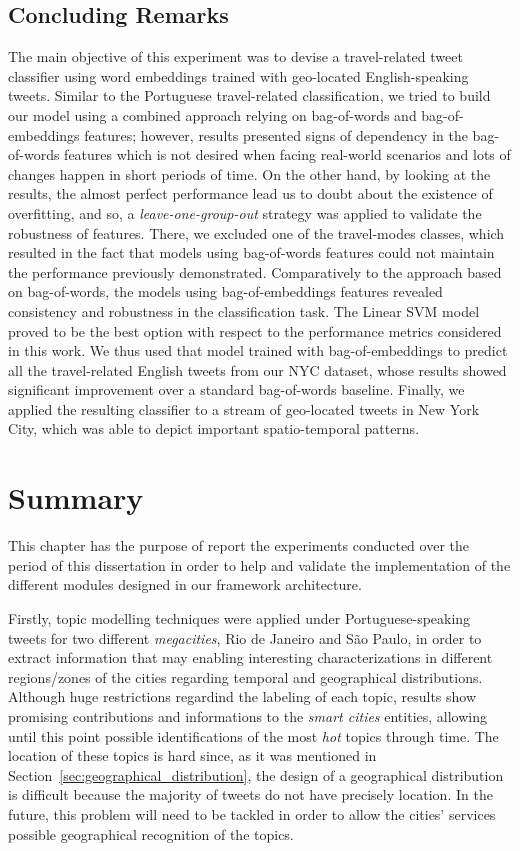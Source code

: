 \subsection{Concluding Remarks}
The main objective of this experiment was to devise a travel-related tweet classifier using word embeddings trained with geo-located English-speaking tweets. Similar to the Portuguese travel-related classification, we tried to build our model using a combined approach relying on bag-of-words and bag-of-embeddings features; however, results presented signs of dependency in the bag-of-words features which is not desired when facing real-world scenarios and lots of changes happen in short periods of time. On the other hand, by looking at the results, the almost perfect performance lead us to doubt about the existence of overfitting, and so, a \emph{leave-one-group-out} strategy was applied to validate the robustness of features. There, we excluded one of the travel-modes classes, which resulted in the fact that models using bag-of-words features could not maintain the performance previously demonstrated. Comparatively to the approach based on bag-of-words, the models using bag-of-embeddings features revealed consistency and robustness in the classification task. The Linear SVM model proved to be the best option with respect to the performance metrics considered in this work. We thus used that model trained with bag-of-embeddings to predict all the travel-related English tweets from our NYC dataset, whose results showed significant improvement over a standard bag-of-words baseline. Finally, we applied the resulting classifier to a stream of geo-located tweets in New York City, which was able to depict important spatio-temporal patterns.

\section{Summary}
This chapter has the purpose of report the experiments conducted over the period of this dissertation in order to help and validate the implementation of the different modules designed in our framework architecture.

Firstly, topic modelling techniques were applied under Portuguese-speaking tweets for two different \textit{megacities}, Rio de Janeiro and São Paulo, in order to extract information that may enabling interesting characterizations in different regions/zones of the cities regarding temporal and geographical distributions. Although huge restrictions regardind the labeling of each topic, results show promising contributions and informations to the \textit{smart cities} entities, allowing until this point possible identifications of the most \textit{hot} topics through time. The location of these topics is hard since, as it was mentioned in Section~\ref{sec:geographical_distribution}, the design of a geographical distribution is difficult because the majority of tweets do not have precisely location. In the future, this problem will need to be tackled in order to allow the cities' services possible geographical recognition of the topics.

